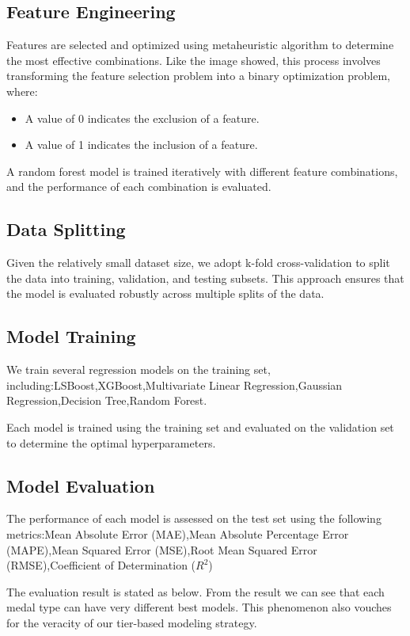 \documentclass{mcmthesis}
\begin{document}
\subsection{Feature Engineering}

Features are selected and optimized using metaheuristic algorithm to determine the most effective combinations. Like the image showed, this process involves transforming the feature selection problem into a binary optimization problem, where:
\begin{itemize}
    \item A value of 0 indicates the exclusion of a feature.
    \item A value of 1 indicates the inclusion of a feature.
\end{itemize}
A random forest model is trained iteratively with different feature combinations, and the performance of each combination is evaluated. 


\subsection{Data Splitting}

Given the relatively small dataset size, we adopt k-fold cross-validation to split the data into training, validation, and testing subsets. This approach ensures that the model is evaluated robustly across multiple splits of the data.

\subsection{Model Training}

We train several regression models on the training set, including:LSBoost,XGBoost,Multivariate Linear Regression,Gaussian Regression,Decision Tree,Random Forest.

Each model is trained using the training set and evaluated on the validation set to determine the optimal hyperparameters.

\subsection{Model Evaluation}

The performance of each model is assessed on the test set using the following metrics:Mean Absolute Error (MAE),Mean Absolute Percentage Error (MAPE),Mean Squared Error (MSE),Root Mean Squared Error (RMSE),Coefficient of Determination ($R^2$)

The evaluation result is stated as below. From the result we can see that each medal type can have very different best models. This phenomenon also vouches for the veracity of our tier-based modeling strategy.
\end{document}
